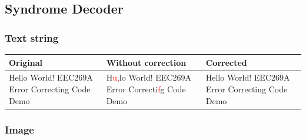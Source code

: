 \documentclass{article}
\begin{document}
\subsection{Syndrome Decoder}
\subsubsection{Text string}


\begin{center}
    \renewcommand{\arraystretch}{1.5}
    \begin{tabulary}{\textwidth}{ |L|L|L| } 
    \hline
    \textbf{Original} & \textbf{Without correction} & \textbf{Corrected} \\
    \hline
    Hello World! EEC269A Error Correcting Code Demo & H\textcolor{red}{u,}lo World! EEC269A Error Correcti\textcolor{red}{f}g Code Demo & Hello World! EEC269A Error Correcting Code Demo \\
    \hline
    \end{tabulary}
\end{center}



\subsubsection{Image}
\end{document}
